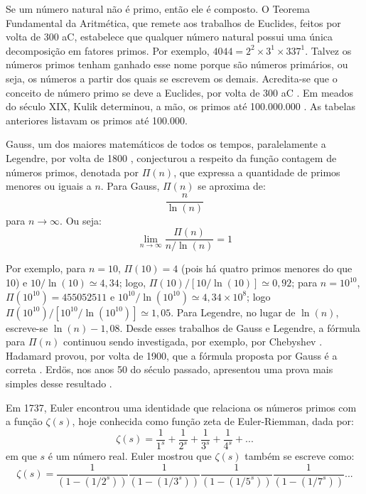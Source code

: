 \documentclass[12pt,a4paper,fleqn]{report}
\begin{document}
Se um número natural não é primo, então ele é composto.
O Teorema Fundamental da Aritmética, que remete aos trabalhos de Euclides, feitos por volta de 300 aC, estabelece que qualquer número natural possui uma única decomposição em fatores primos. Por exemplo, $4044=2^2 \times 3^1 \times 337^1$. Talvez os números primos tenham ganhado esse nome porque são números primários, ou seja, os números a partir dos quais se escrevem os demais. Acredita-se que o conceito de número primo se deve a Euclides, por volta de 300 aC \cite{garbi09}. Em meados do século XIX, Kulik determinou, a mão, os primos até 100.000.000 \cite{kulik83}. As tabelas anteriores listavam os primos até 100.000.



Gauss, um dos maiores matemáticos de todos os tempos, paralelamente a Legendre,
por volta de 1800 \cite{d05}, conjecturou a respeito da função  contagem de números
primos, denotada por $\Pi(n)$, que expressa a quantidade de primos menores ou iguais a $n$. Para Gauss, $\Pi(n)$
se aproxima de:
$$\frac{n}{\ln(n)}$$
para $n \to \infty$. Ou seja:
$$\lim_{n\to \infty}\frac{\Pi(n)}{n/\ln(n)} = 1$$

\noindent
Por exemplo, para $n=10$, $\Pi(10)=4$ (pois há quatro primos menores do que 10) e 
$10/\ln(10) \simeq 4,34$; logo,
$\Pi(10)/[10/\ln(10)] \simeq 0,92$; para $n=10^{10}$, $\Pi(10^{10})=455052511$ e $10^{10}/\ln(10^{10}) \simeq 4,34 \times 10^8$; logo $\Pi(10^{10})/[10^{10}/\ln(10^{10})] \simeq 1,05$. Para Legendre,
no lugar de $\ln(n)$, escreve-se $\ln(n)-1,08$.
Desde esses trabalhos de Gauss e Legendre, a fórmula para $\Pi(n)$ continuou sendo investigada, por exemplo, por Chebyshev \cite{t16}. Hadamard provou, por volta de 1900, que a fórmula proposta por Gauss é a correta \cite{ken98}. Erd\"os, nos anos 50 do século passado, apresentou uma prova mais simples desse resultado \cite{ten}.

Em 1737, Euler encontrou uma identidade que relaciona os números primos com a função $\zeta(s)$,
hoje conhecida como função zeta de Euler-Riemman, dada por:
$$
\zeta(s) = \frac{1}{1^s} + \frac{1}{2^s} + \frac{1}{3^s} +
\frac{1}{4^s} + ...
$$
\noindent em que $s$ \'e um número real. Euler mostrou que $\zeta(s)$ também se escreve como:
$$
\zeta(s) = \frac{1}{(1-(1/2^s))} \frac{1}{(1-(1/3^s))}  \frac{1}{(1-(1/5^s))} 
\frac{1}{(1-(1/7^s))}  ...
$$
\end{document}

